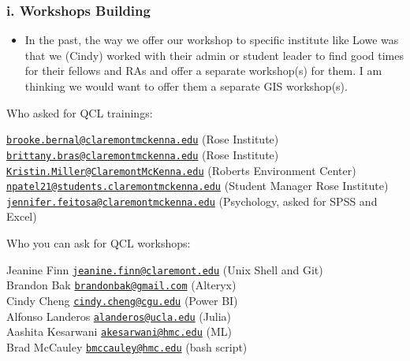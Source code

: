 \documentclass[
]{book}
\providecommand{\tightlist}{%
  \setlength{\itemsep}{0pt}\setlength{\parskip}{0pt}}
\begin{document}
\hypertarget{i.-workshops-building}{%
\subsubsection{\texorpdfstring{i. Workshops Building }{i. Workshops Building }}\label{i.-workshops-building}}

\begin{itemize}
\tightlist
\item
  In the past, the way we offer our workshop to specific institute like Lowe was that we (Cindy) worked with their admin or student leader to find good times for their fellows and RAs and offer a separate workshop(s) for them. I am thinking we would want to offer them a separate GIS workshop(s).
\end{itemize}

Who asked for QCL trainings:

\href{mailto:brooke.bernal@claremontmckenna.edu}{\nolinkurl{brooke.bernal@claremontmckenna.edu}} (Rose Institute)\\
\href{mailto:brittany.bras@claremontmckenna.edu}{\nolinkurl{brittany.bras@claremontmckenna.edu}} (Rose Institute)\\
\href{mailto:Kristin.Miller@ClaremontMcKenna.edu}{\nolinkurl{Kristin.Miller@ClaremontMcKenna.edu}} (Roberts Environment Center)\\
\href{mailto:npatel21@students.claremontmckenna.edu}{\nolinkurl{npatel21@students.claremontmckenna.edu}} (Student Manager Rose Institute)\\
\href{mailto:jennifer.feitosa@claremontmckenna.edu}{\nolinkurl{jennifer.feitosa@claremontmckenna.edu}} (Psychology, asked for SPSS and Excel)

Who you can ask for QCL workshops:

Jeanine Finn \href{mailto:jeanine.finn@claremont.edu}{\nolinkurl{jeanine.finn@claremont.edu}} (Unix Shell and Git)\\
Brandon Bak \href{mailto:brandonbak@gmail.com}{\nolinkurl{brandonbak@gmail.com}} (Alteryx)\\
Cindy Cheng \href{mailto:cindy.cheng@cgu.edu}{\nolinkurl{cindy.cheng@cgu.edu}} (Power BI)\\
Alfonso Landeros \href{mailto:alanderos@ucla.edu}{\nolinkurl{alanderos@ucla.edu}} (Julia)\\
Aashita Kesarwani \href{mailto:akesarwani@hmc.edu}{\nolinkurl{akesarwani@hmc.edu}} (ML)\\
Brad McCauley \href{mailto:bmccauley@hmc.edu}{\nolinkurl{bmccauley@hmc.edu}} (bash script)
\end{document}
